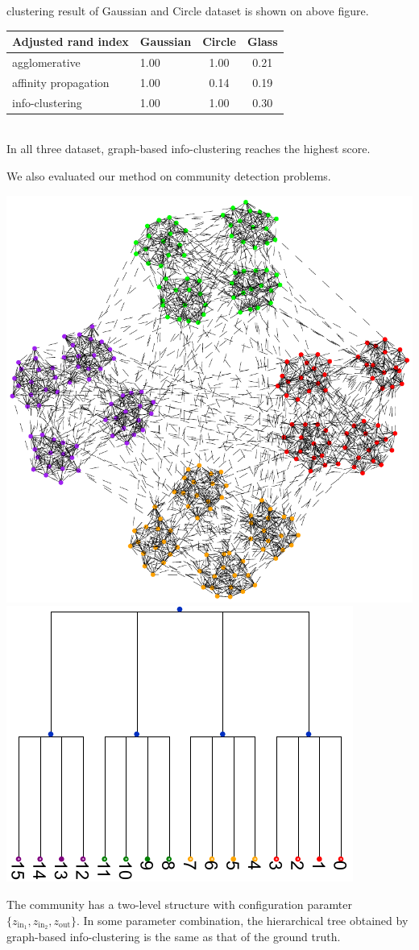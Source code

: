 \documentclass[portrait,final,archE,fontscale=0.3]{baposter}
\begin{document}
\begin{poster}
{\begin{multicols}{2}
clustering result of Gaussian and Circle dataset is shown on above figure.
\\

\begin{tabular}{lp{1.1cm}cc}
\hline
 Adjusted rand index   &   Gaussian &   Circle &   Glass \\
\hline
 agglomerative         &       1.00 &     1.00 &    0.21 \\
 affinity propagation  &       1.00 &     0.14 &    0.19 \\
 info-clustering       &       1.00 &     1.00 &    0.30 \\
\hline
\end{tabular}
\\

In all three dataset, graph-based info-clustering reaches the highest score.

We also evaluated our method on community detection problems. 

{
\includegraphics[width=0.4\linewidth]{img/two_level.pdf}
\includegraphics[width=0.46\linewidth]{img/tree_info-clustering.pdf} 
}

The community has a two-level structure with configuration paramter $\{z_{\mathrm{in}_1}, z_{\mathrm{in}_2}, z_{\mathrm{out}} \}$.
In some parameter combination, the hierarchical tree obtained by graph-based info-clustering is the same as that of the ground truth.\\


\end{multicols}}
\end{poster}
\end{document}
